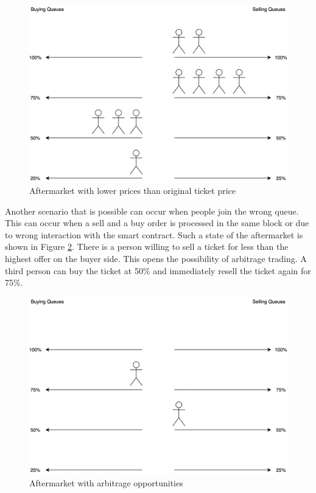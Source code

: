 \begin{figure}[H]
    \centering
    \includegraphics[width=12cm]{figures/aftermarket-mixed.png}
    \caption{Aftermarket with lower prices than original ticket price}
    \label{fig:aftermarket-mixed}
\end{figure}

Another scenario that is possible can occur when people join the wrong queue. This can occur when a sell and a buy order is processed in the same block or due to wrong interaction with the smart contract. Such a state of the aftermarket is shown in Figure \ref{fig:aftermarket-arbitrage}. There is a person willing to sell a ticket for less than the highest offer on the buyer side. This opens the possibility of arbitrage trading. A third person can buy the ticket at 50\% and immediately resell the ticket again for 75\%. 

\begin{figure}[H]
    \centering
    \includegraphics[width=12cm]{figures/aftermarket-arbitrage.png}
    \caption{Aftermarket with arbitrage opportunities}
    \label{fig:aftermarket-arbitrage}
\end{figure}

